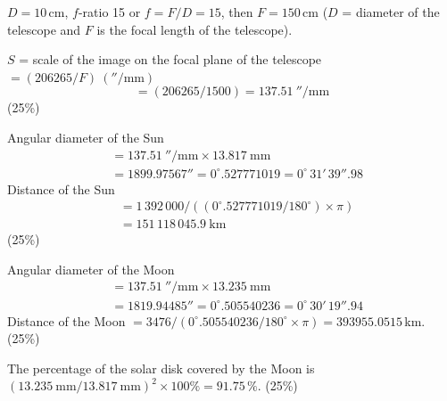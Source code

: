 $D = 10$\,cm, $f$-ratio 15 or $f = F/D = 15$, then $F = 150$\,cm
($D$ = diameter of the telescope and $F$ is the focal length of the
telescope).

$S$ = scale of the image on the focal plane of the telescope
$= (206265/F)\ (''/\mathrm{mm})$
\[
= (206265/1500) = 137.51\ ''/\mathrm{mm}
\]
\hfill(25\%)

Angular diameter of the Sun
\begin{align*}
&= 137.51\ ''/\mathrm{mm} \times 13.817\ \mathrm{mm}\\
&= 1899.97567'' = 0^\circ.527771019 = 0^\circ\,31'\,39''.98
\end{align*}
Distance of the Sun
\begin{align*}
&= 1\,392\,000/\left((0^\circ.527771019/180^\circ)\times\pi\right)\\
&= 151\,118\,045.9\ \mathrm{km}
\end{align*}
\hfill(25\%)

Angular diameter of the Moon
\begin{align*}
&= 137.51\ ''/\mathrm{mm} \times 13.235\ \mathrm{mm}\\
&= 1819.94485'' = 0^\circ.505540236 = 0^\circ\,30'\,19''.94
\end{align*}
Distance of the Moon
$= 3476/(0^\circ.505540236/180^\circ \times \pi) = 393955.0515$\,km.
\hfill(25\%)

The percentage of the solar disk covered by the Moon is
$(13.235\ \mathrm{mm}/13.817\ \mathrm{mm})^2 \times 100\% = 91.75\,\%$.
\hfill(25\%)
